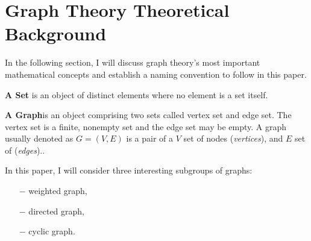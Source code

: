 \section{Graph Theory Theoretical Background}\label{sec:theoreticalBackground}
In the following section, I will discuss graph theory's most important mathematical concepts and establish a naming convention to follow in this paper. 
\begin{definition}\textbf{A Set} is an object of distinct elements where no element is a set itself.\end{definition}
\begin{definition}\textbf{A Graph}is an object comprising two sets called vertex set and edge set. The vertex set is a finite, nonempty set and the edge set may be empty. A graph usually denoted as $ G = (V, E)$ is a pair of a $V$ set of nodes (\textit{vertices}), and $E$ set of (\textit{edges}).. \end{definition}
In this paper, I will consider three interesting subgroups of graphs:
 \begin{itemize}
 \item[$-$] weighted graph,
 \item[$-$] directed graph,
 \item[$-$] cyclic graph.
 \end{itemize}
